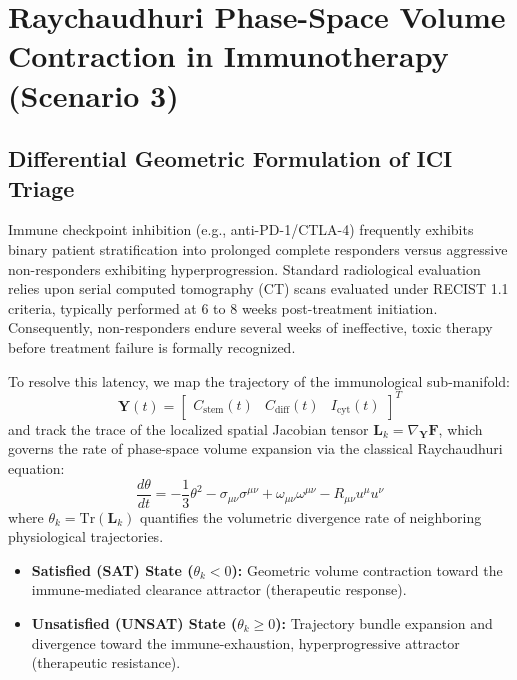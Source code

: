 \documentclass[11pt,a4paper]{article}
\begin{document}
\section{Raychaudhuri Phase-Space Volume Contraction in Immunotherapy (Scenario 3)}

\subsection{Differential Geometric Formulation of ICI Triage}

Immune checkpoint inhibition (e.g., anti-PD-1/CTLA-4) frequently exhibits binary patient stratification into prolonged complete responders versus aggressive non-responders exhibiting hyperprogression. Standard radiological evaluation relies upon serial computed tomography (CT) scans evaluated under RECIST 1.1 criteria, typically performed at 6 to 8 weeks post-treatment initiation. Consequently, non-responders endure several weeks of ineffective, toxic therapy before treatment failure is formally recognized.

To resolve this latency, we map the trajectory of the immunological sub-manifold:
\begin{equation}
\bm{Y}(t) = \begin{bmatrix} C_{\mathrm{stem}}(t) & C_{\mathrm{diff}}(t) & I_{\mathrm{cyt}}(t) \end{bmatrix}^T
\end{equation}
and track the trace of the localized spatial Jacobian tensor $\bm{L}_k = \nabla_{\bm{Y}} \bm{F}$, which governs the rate of phase-space volume expansion via the classical Raychaudhuri equation:
\begin{equation}
\frac{d\theta}{dt} = - \frac{1}{3}\theta^2 - \sigma_{\mu\nu}\sigma^{\mu\nu} + \omega_{\mu\nu}\omega^{\mu\nu} - R_{\mu\nu} u^\mu u^\nu
\end{equation}
where $\theta_k = \mathrm{Tr}(\bm{L}_k)$ quantifies the volumetric divergence rate of neighboring physiological trajectories.
\begin{itemize}
    \item \textbf{Satisfied (SAT) State ($\theta_k < 0$):} Geometric volume contraction toward the immune-mediated clearance attractor (therapeutic response).
    \item \textbf{Unsatisfied (UNSAT) State ($\theta_k \ge 0$):} Trajectory bundle expansion and divergence toward the immune-exhaustion, hyperprogressive attractor (therapeutic resistance).
\end{itemize}
\end{document}
